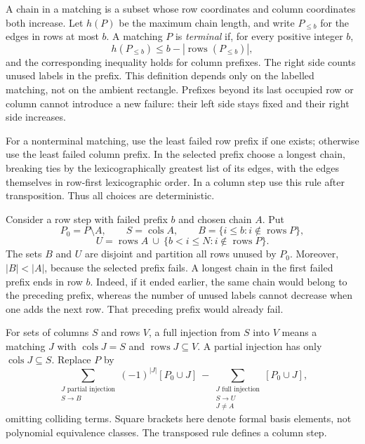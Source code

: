\documentclass[11pt,a4paper,oneside,openany]{book}
\theoremstyle{definition}\newtheorem{definition}[theorem]{Definition}
\theoremstyle{remark}\newtheorem{remark}[theorem]{Remark}
\numberwithin{equation}{chapter}
\begin{document}
A chain in a matching is a subset whose row coordinates and column
coordinates both increase.  Let $h(P)$ be the maximum chain length, and
write $P_{\leq b}$ for the edges in rows at most $b$.  A matching $P$ is
\emph{terminal} if, for every positive integer $b$,
\[
 h(P_{\leq b})\leq b-|\operatorname{rows}(P_{\leq b})|,
\]
and the corresponding inequality holds for column prefixes.  The right
side counts unused labels in the prefix.  This definition depends only
on the labelled matching, not on the ambient rectangle.  Prefixes beyond
its last occupied row or column cannot introduce a new failure: their
left side stays fixed and their right side increases.

For a nonterminal matching, use the least failed row prefix if one exists;
otherwise use the least failed column prefix.  In the selected prefix
choose a longest chain, breaking ties by the lexicographically greatest
list of its edges, with the edges themselves in row-first lexicographic
order.  In a column step use this rule after transposition.  Thus all
choices are deterministic.

Consider a row step with failed prefix $b$ and chosen chain $A$.  Put
\[
 P_0=P\setminus A,\qquad S=\operatorname{cols}A,\qquad
 B=\{i\leq b:i\notin\operatorname{rows}P\},
\]
\[
 U=\operatorname{rows}A\ \cup\
       \{b<i\leq N:i\notin\operatorname{rows}P\}.
\]
The sets $B$ and $U$ are disjoint and partition all rows unused by $P_0$.
Moreover, $|B|<|A|$, because the selected prefix fails.  A longest chain
in the first failed prefix ends in row $b$.  Indeed, if it ended earlier,
the same chain would belong to the preceding prefix, whereas the number
of unused labels cannot decrease when one adds the next row.  That
preceding prefix would already fail.

For sets of columns $S$ and rows $V$, a full injection from $S$ into $V$
means a matching $J$ with $\operatorname{cols}J=S$ and
$\operatorname{rows}J\subseteq V$.  A partial injection has only
$\operatorname{cols}J\subseteq S$.  Replace $P$ by
\[
 \sum_{\substack{J\text{ partial injection}\\S\to B}}
       (-1)^{|J|}[P_0\cup J]
 \ -\!
 \sum_{\substack{J\text{ full injection}\\S\to U\\J\ne A}}
       [P_0\cup J],
\]
omitting colliding terms.  Square brackets here denote formal basis
elements, not polynomial equivalence classes.  The transposed rule defines
a column step.
\end{document}
